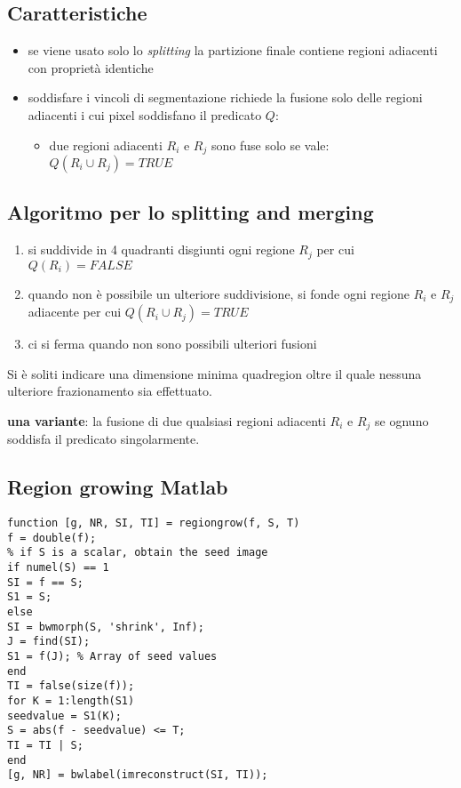 \subsection{Caratteristiche}
\begin{itemize}
	\item se viene usato solo lo \textit{splitting} la partizione finale contiene regioni adiacenti con proprietà identiche
	
	\item soddisfare i vincoli di segmentazione richiede la	fusione solo delle regioni adiacenti i cui pixel soddisfano il predicato $Q$:
	
	\begin{itemize}
		\item due regioni adiacenti $R_i$ e $R_j$ sono fuse solo se vale: $Q(R_i \cup R_j) = TRUE$
	\end{itemize}
\end{itemize}

\subsection{Algoritmo per lo splitting and merging}
\begin{enumerate}
	\item si suddivide in 4 quadranti disgiunti ogni regione $R_j$ per cui $Q(R_i) = FALSE$
	
	\item quando non è possibile un ulteriore suddivisione, si fonde ogni regione $R_i$ e $R_j$ adiacente per cui $Q(R_i \cup R_j) = TRUE$
	
	\item ci si ferma quando non sono possibili ulteriori fusioni
\end{enumerate}

Si è soliti indicare una dimensione minima quadregion oltre il quale nessuna ulteriore frazionamento sia effettuato.

\textbf{una variante}: la fusione di due qualsiasi regioni adiacenti $R_i$ e $R_j$ se
ognuno soddisfa il predicato singolarmente.

\subsection{Region growing Matlab}

\begin{lstlisting}
function [g, NR, SI, TI] = regiongrow(f, S, T)
f = double(f);
% if S is a scalar, obtain the seed image
if numel(S) == 1
SI = f == S;
S1 = S;
else
SI = bwmorph(S, 'shrink', Inf);
J = find(SI);
S1 = f(J); % Array of seed values
end
TI = false(size(f));
for K = 1:length(S1)
seedvalue = S1(K);
S = abs(f - seedvalue) <= T;
TI = TI | S;
end
[g, NR] = bwlabel(imreconstruct(SI, TI));
\end{lstlisting}

